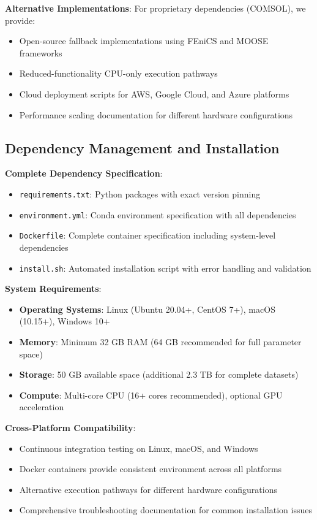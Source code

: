 \documentclass[12pt,a4paper]{article}
\begin{document}
\textbf{Alternative Implementations}: For proprietary dependencies (COMSOL), we provide:
\begin{itemize}
\item Open-source fallback implementations using FEniCS and MOOSE frameworks
\item Reduced-functionality CPU-only execution pathways
\item Cloud deployment scripts for AWS, Google Cloud, and Azure platforms
\item Performance scaling documentation for different hardware configurations
\end{itemize}

\subsection{Dependency Management and Installation}

\textbf{Complete Dependency Specification}:
\begin{itemize}
\item \texttt{requirements.txt}: Python packages with exact version pinning
\item \texttt{environment.yml}: Conda environment specification with all dependencies
\item \texttt{Dockerfile}: Complete container specification including system-level dependencies
\item \texttt{install.sh}: Automated installation script with error handling and validation
\end{itemize}

\textbf{System Requirements}:
\begin{itemize}
\item \textbf{Operating Systems}: Linux (Ubuntu 20.04+, CentOS 7+), macOS (10.15+), Windows 10+
\item \textbf{Memory}: Minimum 32 GB RAM (64 GB recommended for full parameter space)
\item \textbf{Storage}: 50 GB available space (additional 2.3 TB for complete datasets)
\item \textbf{Compute}: Multi-core CPU (16+ cores recommended), optional GPU acceleration
\end{itemize}

\textbf{Cross-Platform Compatibility}:
\begin{itemize}
\item Continuous integration testing on Linux, macOS, and Windows
\item Docker containers provide consistent environment across all platforms
\item Alternative execution pathways for different hardware configurations
\item Comprehensive troubleshooting documentation for common installation issues
\end{itemize}
\end{document}
